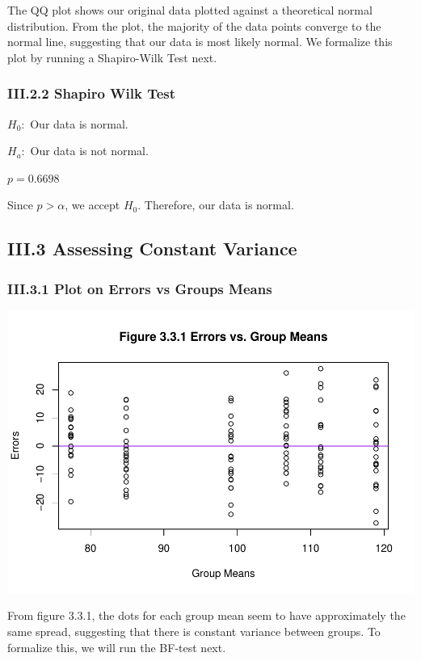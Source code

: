 \documentclass[
]{article}
\begin{document}
The QQ plot shows our original data plotted against a theoretical normal
distribution. From the plot, the majority of the data points converge to
the normal line, suggesting that our data is most likely normal. We
formalize this plot by running a Shapiro-Wilk Test next.

\subsubsection{III.2.2 Shapiro Wilk
Test}\label{iii.2.2-shapiro-wilk-test}

\(H_0:\) Our data is normal.

\(H_a:\) Our data is not normal.

\(p = 0.6698\)

Since \(p > \alpha\), we accept \(H_0\). Therefore, our data is normal.

\subsection{III.3 Assessing Constant
Variance}\label{iii.3-assessing-constant-variance}

\subsubsection{III.3.1 Plot on Errors vs Groups
Means}\label{iii.3.1-plot-on-errors-vs-groups-means}

\includegraphics{STA_106_Project_2_files/figure-latex/unnamed-chunk-6-1.pdf}

From figure 3.3.1, the dots for each group mean seem to have
approximately the same spread, suggesting that there is constant
variance between groups. To formalize this, we will run the BF-test
next.
\end{document}
